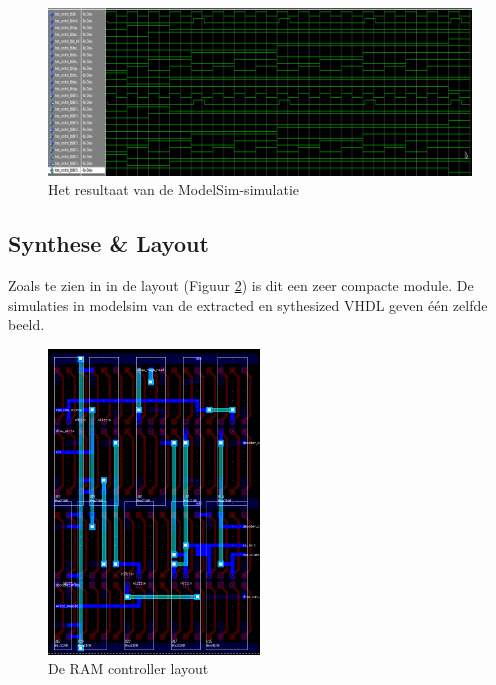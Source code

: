 \documentclass{scrreprt} %
\begin{document}
\begin{figure}[H]
\centering
	\includegraphics[width=\textwidth]{resources/wave-narrow.png}
	\caption{Het resultaat van de ModelSim-simulatie}
	\label{fig:ramcontroller-sim}
\end{figure}

\subsection{Synthese \& Layout}
Zoals te zien in in de layout (Figuur \ref{fig:ramcontroller-layout}) is dit een zeer compacte module. De simulaties in modelsim van de extracted en sythesized VHDL geven één zelfde beeld.

\begin{figure}[H]
\centering
	\includegraphics[width=0.5\textwidth]{resources/layout_ramcontroller.png}
	\caption{De RAM controller layout}
	\label{fig:ramcontroller-layout}
\end{figure}

\end{document}
